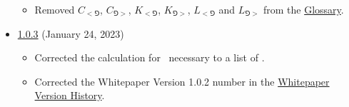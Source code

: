 \documentclass[class=article, crop=false]{standalone}
\begin{document}
\begin{itemize}[topsep=0pt, itemsep=3pt,leftmargin=16pt]
\begin{itemize}
        \item Removed $C_{<\Game}$, $C_{\Game>}$, $K_{<\Game}$, $K_{\Game>}$, $L_{<\Game}$ and $L_{\Game>}$ from the \hyperlink{subsection.8.2}{Glossary}. 
    \end{itemize}
    \item \href{https://github.com/RootToken/Root-Whitepaper/blob/master/version-history/root1_0_3.pdf}{1.0.3} (January 24, 2023)
    \begin{itemize}
        \item Corrected the calculation for \Root\ necessary to  a list of  .
        \item Corrected the Whitepaper Version 1.0.2 number in the \hyperlink{subsection.8.3}{Whitepaper Version History}. 
    \end{itemize}
\end{itemize}
\end{document}
